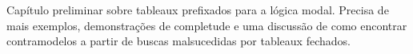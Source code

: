 \documentclass[../../../include/open-logic-chapter]{subfiles}
\begin{document}

\begin{editorial}
  Capítulo preliminar sobre tableaux prefixados para a lógica modal.
  Precisa de mais exemplos, demonstrações de completude e uma discussão
  de como encontrar contramodelos a partir de buscas malsucedidas por
  tableaux fechados.
\end{editorial}


\OLEndChapterHook
\end{document}
